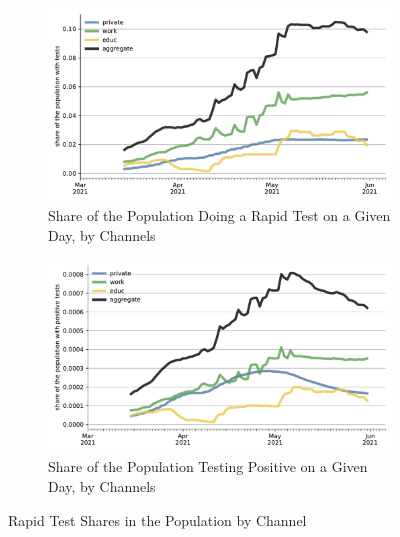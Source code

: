 \begin{figure}[ht] %
   \centering
   \begin{subfigure}[b]{0.49\textwidth}
      \includegraphics[width=\textwidth]{figures/results/figures/rapid_test_statistics/popshare_tested}
      \caption{Share of the Population Doing a Rapid Test on a Given Day, by Channels}
      \label{fig:rapid_test_demand_by_channel}
   \end{subfigure}
   \hfill
   \begin{subfigure}[b]{0.49\textwidth}
      \includegraphics[width=\textwidth]{figures/results/figures/rapid_test_statistics/popshare_tested_positive}
      \caption{Share of the Population Testing Positive on a Given Day, by Channels}
      \label{fig:pos_rapid_tests_by_channel}
   \end{subfigure}
   \caption{Rapid Test Shares in the Population by Channel}
\end{figure}
